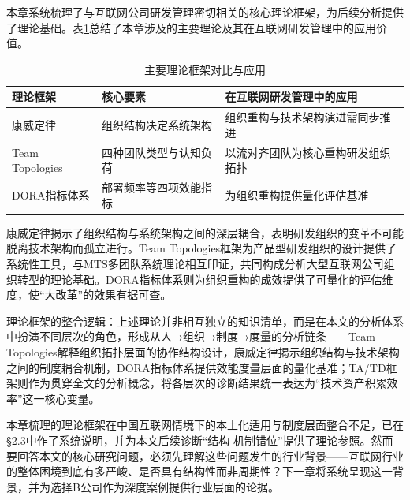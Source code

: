 本章系统梳理了与互联网公司研发管理密切相关的核心理论框架，为后续分析提供了理论基础。表\ref{tab:theory-comparison}总结了本章涉及的主要理论及其在互联网研发管理中的应用价值。

\begin{table}[htbp]
\centering
\caption{主要理论框架对比与应用}
\label{tab:theory-comparison}
\begin{tabular}{p{3cm}p{4cm}p{5.5cm}}
\toprule
\textbf{理论框架} & \textbf{核心要素} & \textbf{在互联网研发管理中的应用} \\
\midrule
康威定律 & 组织结构决定系统架构 & 组织重构与技术架构演进需同步推进 \\
Team Topologies & 四种团队类型与认知负荷 & 以流对齐团队为核心重构研发组织拓扑 \\
DORA指标体系 & 部署频率等四项效能指标 & 为组织重构提供量化评估基准 \\
\bottomrule
\end{tabular}
\end{table}

康威定律揭示了组织结构与系统架构之间的深层耦合，表明研发组织的变革不可能脱离技术架构而孤立进行。Team Topologies框架为产品型研发组织的设计提供了系统性工具，与MTS多团队系统理论相互印证，共同构成分析大型互联网公司组织转型的理论基础。DORA指标体系则为组织重构的成效提供了可量化的评估维度，使“大改革”的效果有据可查。

理论框架的整合逻辑：上述理论并非相互独立的知识清单，而是在本文的分析体系中扮演不同层次的角色，形成从人→组织→制度→度量的分析链条——Team Topologies解释组织拓扑层面的协作结构设计，康威定律揭示组织结构与技术架构之间的制度耦合机制，DORA指标体系提供效能度量层面的量化基准；TA/TD框架则作为贯穿全文的分析概念，将各层次的诊断结果统一表达为“技术资产积累效率”这一核心变量。

本章梳理的理论框架在中国互联网情境下的本土化适用与制度层面整合不足，已在§2.3中作了系统说明，并为本文后续诊断“结构-机制错位”提供了理论参照。然而要回答本文的核心研究问题，必须先理解这些问题发生的行业背景——互联网行业的整体困境到底有多严峻、是否具有结构性而非周期性？下一章将系统呈现这一背景，并为选择B公司作为深度案例提供行业层面的论据。
